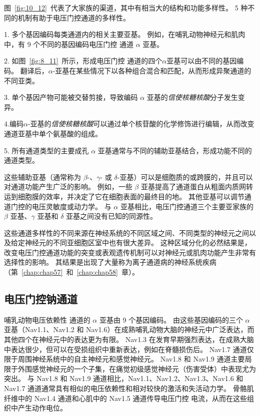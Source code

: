 图~\ref{fig:10_12}~代表了大家族的渠道，其中有相当大的结构和功能多样性。
5 种不同的机制有助于电压门控通道的多样性。


1. 多个基因编码每类通道内的相关主要亚基。
例如，在哺乳动物神经元和肌肉中，有 9 个不同的基因编码电压门控  通道 $\alpha$ 亚基。


2. 如图~\ref{fig:8_11}~所示，形成电压门控  通道的四个$\alpha$亚基可以由不同的基因编码。
翻译后，$\alpha$-亚基在某些情况下以各种组合混合和匹配，从而形成异聚通道的不同亚类。


3. 单个基因产物可能被交替剪接，导致编码 $\alpha$ 亚基的\textit{信使核糖核酸}分子发生变异。


4.编码$\alpha$-亚基的\textit{信使核糖核酸}可以通过单个核苷酸的化学修饰进行编辑，从而改变通道亚基中单个氨基酸的组成。


5. 所有通道类型的主要成孔 $\alpha$ 亚基通常与不同的辅助亚基结合，形成功能不同的通道类型。


这些辅助亚基（通常称为 $\beta$-、$\gamma$- 或 $\delta$-亚基）可以是细胞质的或跨膜的，并且可以对通道功能产生广泛的影响。
例如，一些 $\beta$ 亚基提高了通道蛋白从粗面内质网转运到细胞膜的效率，并决定了它在细胞表面的最终目的地。
其他亚基可以调节通道门控的电压灵敏度或动力学。
与 $\alpha$ 亚基相比，电压门控通道三个主要亚家族的 $\beta$ 亚基、$\gamma$ 亚基和 $\delta$ 亚基之间没有已知的同源性。


这些通道多样性的不同来源在神经系统的不同区域之间、不同类型的神经元之间以及给定神经元的不同亚细胞区室中也有很大差异。
这种区域分化的必然结果是，改变电压门控通道功能的突变或表观遗传机制可以对神经元或肌肉功能产生非常有选择性的影响。
其结果是出现了大量称为离子通道病的神经系统疾病（第~\ref{chap:chap57}~和~\ref{chap:chap58}~章）。



\subsection{电压门控钠通道}

哺乳动物电压依赖性  通道的 $\alpha$ 亚基由 9 个基因编码。
由这些基因编码的三个 $\alpha$ 亚基（Nav1.1、Nav1.2 和 Nav1.6）在成熟哺乳动物大脑的神经元中广泛表达，而其他四个在神经元中的表达更为有限。
Nav1.3 在发育早期强烈表达，在成熟大脑中表达很少，但可以在受损组织中重新表达，例如在脊髓损伤后。
Nav1.7 通道仅限于周围神经系统中的自主神经元和感觉神经元。
Nav1.8 和 Nav1.9 通道主要局限于外围感觉神经元的一个子集，在痛觉初级感觉神经元（伤害受体）中表现尤为突出。
与 Nav1.8 和 Nav1.9 通道相比，Nav1.1、Nav1.2、Nav1.3、Nav1.6 和 Nav1.7 通道通常具有相似的电压依赖性和相对较快的激活和失活动力学。 
骨骼肌纤维中的 Nav1.4 通道和心肌中的 Nav1.5 通道传导电压门控  电流，从而在这些组织中产生动作电位。


